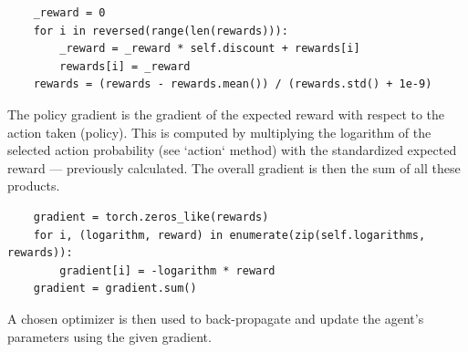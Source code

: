 \documentclass{article}
\let\oldcite\cite
\renewcommand{\cite}[1]{\textbf{\oldcite{#1}}}
\renewenvironment{leftbar}[1][\hsize]{
    \def\FrameCommand{{\color{barcolor}\vrule width 0.5pt \hspace{10pt}}}
    \MakeFramed{\hsize#1 \advance\hsize-\width \FrameRestore}
}{\endMakeFramed}
\begin{document}
\begin{leftbar}
    \begin{lstlisting}
    _reward = 0
    for i in reversed(range(len(rewards))):
        _reward = _reward * self.discount + rewards[i]
        rewards[i] = _reward
    rewards = (rewards - rewards.mean()) / (rewards.std() + 1e-9)
    \end{lstlisting}

    The policy gradient is the gradient of the expected reward with respect to the action taken (policy). This is computed by multiplying the logarithm of the selected action probability (see `action` method) with the standardized expected reward — previously calculated. The overall gradient is then the sum of all these products.

    \begin{lstlisting}
    gradient = torch.zeros_like(rewards)
    for i, (logarithm, reward) in enumerate(zip(self.logarithms, rewards)):
        gradient[i] = -logarithm * reward
    gradient = gradient.sum()
    \end{lstlisting}

    A chosen optimizer is then used to back-propagate and update the agent's parameters using the given gradient. \cite{REINFORCE}

\end{leftbar}
\end{document}
